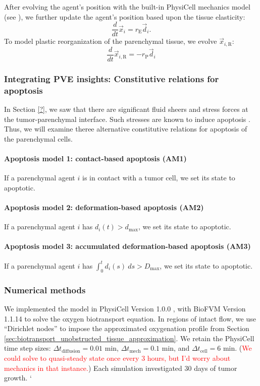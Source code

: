 \documentclass[smallextended,natbib,draft]{svjour3}
\newcommand{\beq}{\begin{equation}}
\newcommand{\eeq}{\end{equation}}
\newcommand{\red}[1]{\textcolor{red}{#1}}
\begin{document}
After evolving the agent's position with the built-in PhysiCell mechanics model  
(see \citet{physicell}), we further update the agent's position based upon 
the tissue elasticity: 
\beq
\frac{d}{dt} \vec{x}_i = r_\mathrm{E}
\vec{d}_i . 
\eeq
To model plastic reorganization of the parenchymal tissue, 
we evolve $\vec{x}_{i,\mathrm{R}}$: 
\beq
\frac{d}{dt}  \vec{x}_{i,\mathrm{R}} = -r_\mathrm{P} \vec{d}_i 
\eeq

\subsubsection{Integrating PVE insights: Constitutive relations for apoptosis}
In Section \ref{?}, we saw that there are significant fluid sheers and 
stress forces at the tumor-parenchymal interface. 
Such stresses are known to induce apoptosis \citep{?}. Thus, we will 
examine theree alternative constitutive relations for apoptosis of the 
parenchymal cells.

\paragraph{Apoptosis model 1: contact-based apoptosis (AM1)} If a parenchymal 
agent $i$ is 
in contact with a tumor cell, we set its state to apoptotic. 

\paragraph{Apoptosis model 2: deformation-based apoptosis (AM2)} If a parenchymal \break agent $i$ 
has $d_i(t) > d_\mathrm{max}$, we set its state to apoptotic. 

\paragraph{Apoptosis model 3: accumulated deformation-based apoptosis (AM3)} 
If a pa\-ren\-chy\-mal agent $i$ has $\int_0^t d_i(s)\: ds > D_\mathrm{max}$, 
we set its state to apoptotic. 

\subsubsection{Numerical methods} We implemented the model 
in PhysiCell Version 1.0.0 \citep{physicell}, with BioFVM Version 1.1.14 \citep{biofvm} 
to solve the oxygen biotransport equation. 
In regions of intact flow, we use ``Dirichlet nodes'' to impose the 
approximated oxygenation profile from Section \ref{sec:biotransport_unobstructed_tissue_approximation}. 
We retain the PhysiCell time step sizes: 
$\Delta t_\mathrm{diffusion} = 0.01 \textrm{ min}$, 
$\Delta t_\mathrm{mech} = 0.1 \textrm{ min}$, and 
$\Delta t_\mathrm{cell} = 6 \textrm{ min}$.  
(\red{We could solve to quasi-steady state once every 3 hours, but I'd worry about 
mechanics in that instance.}) Each simulation investigated 30 days of 
tumor growth. 
\vfill
\pagebreak` 
\end{document}
